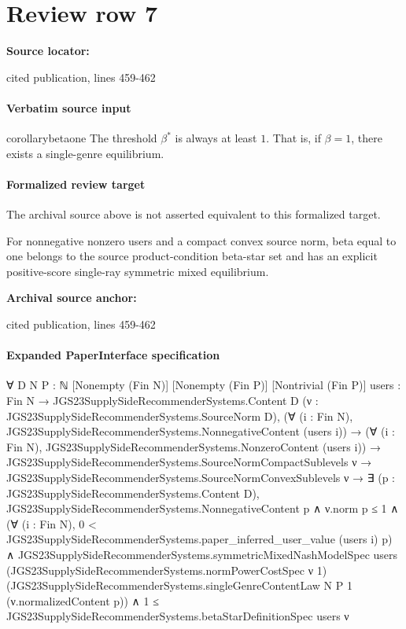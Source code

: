 \documentclass[10pt]{article}
\begin{document}
\section*{Review row 7}
\textbf{Source locator:} {\footnotesize\raggedright cited publication, lines 459-\allowbreak{}462\par}
\paragraph{Verbatim source input}
\begin{ReviewVerbatim}
\begin{restatable}{corollary}{betaone}
\label{cor:beta1}
The threshold $\beta^*$ is always at least $1$. That is, if $\beta = 1$, there exists a single-genre equilibrium.
\end{restatable}
\end{ReviewVerbatim}


\paragraph{Formalized review target}
The archival source above is not asserted equivalent to this formalized target.
\begin{ReviewVerbatim}
For nonnegative nonzero users and a compact convex source norm, beta equal to one belongs to the source product-condition beta-star set and has an explicit positive-score single-ray symmetric mixed equilibrium.
\end{ReviewVerbatim}

\textbf{Archival source anchor:} {\footnotesize\raggedright cited publication, lines 459-\allowbreak{}462\par}
\paragraph{Expanded PaperInterface specification}
\begin{ReviewVerbatim}
∀ {D N P : ℕ} [Nonempty (Fin N)] [Nonempty (Fin P)] [Nontrivial (Fin P)]
  {users : Fin N → JGS23SupplySideRecommenderSystems.Content D} (ν : JGS23SupplySideRecommenderSystems.SourceNorm D),
  (∀ (i : Fin N), JGS23SupplySideRecommenderSystems.NonnegativeContent (users i)) →
    (∀ (i : Fin N), JGS23SupplySideRecommenderSystems.NonzeroContent (users i)) →
      JGS23SupplySideRecommenderSystems.SourceNormCompactSublevels ν →
        JGS23SupplySideRecommenderSystems.SourceNormConvexSublevels ν →
          ∃ (p : JGS23SupplySideRecommenderSystems.Content D),
            JGS23SupplySideRecommenderSystems.NonnegativeContent p ∧
              ν.norm p ≤ 1 ∧
                (∀ (i : Fin N), 0 < JGS23SupplySideRecommenderSystems.paper_inferred_user_value (users i) p) ∧
                  JGS23SupplySideRecommenderSystems.symmetricMixedNashModelSpec users
                      (JGS23SupplySideRecommenderSystems.normPowerCostSpec ν 1)
                      (JGS23SupplySideRecommenderSystems.singleGenreContentLaw N P 1 (ν.normalizedContent p)) ∧
                    1 ≤ JGS23SupplySideRecommenderSystems.betaStarDefinitionSpec users ν
\end{ReviewVerbatim}
\end{document}
